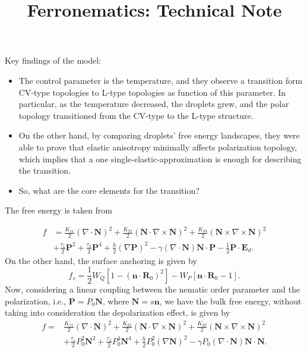 \documentclass[oneside,english]{amsart}
\numberwithin{equation}{section}
\numberwithin{figure}{section}
\begin{document}
\title{Ferronematics: Technical Note}

\maketitle
Key findings of the model:
\begin{itemize}
\item The control parameter is the temperature, and they observe a transition
form CV-type topologies to L-type topologies as function of this parameter.
In particular, as the temperature decreased, the droplets grew, and
the polar topology transitioned from the CV-type to the L-type structure.
\item On the other hand, by comparing droplets\textquoteright{} free energy
landscapes, they were able to prove that elastic anisotropy minimally
affects polarization topology, which implies that a one single-elastic-approximation
is enough for describing the transition.
\item So, what are the core elements for the transition?
\end{itemize}
The free energy is taken from \cite{key-1}

\begin{align*}
f & =\frac{K_{11}}{2}\left(\nabla\cdot\mathbf{N}\right)^{2}+\frac{K_{22}}{2}\left(\mathbf{N}\cdot\nabla\times\mathbf{N}\right)^{2}+\frac{K_{33}}{2}\left(\mathbf{N}\times\nabla\times\mathbf{N}\right)^{2}\\
 & +\frac{\tau_{1}}{2}\mathbf{P}^{2}+\frac{\tau_{2}}{2}\mathbf{P}^{4}+\frac{h}{2}\left(\nabla\mathbf{P}\right)^{2}-\gamma\left(\nabla\cdot\mathbf{N}\right)\mathbf{N}\cdot\mathbf{P}-\frac{1}{2}\mathbf{P}\cdot\mathbf{E}_{d}.
\end{align*}
On the other hand, the surface anchoring is given by 
\[
f_{s}=\frac{1}{2}W_{Q}\left[1-\left(\mathbf{n}\cdot\mathbf{R}_{0}\right)^{2}\right]-W_{P}\left[\mathbf{n}\cdot\mathbf{R}_{0}-1\right].
\]
Now, considering a linear coupling between the nematic order parameter
and the polarization, i.e., $\mathbf{P}=P_{0}\mathbf{N}$, where $\mathbf{N}=s\mathbf{n}$,
we have the bulk free energy, without taking into consideration the
depolarization effect, is given by 
\begin{align*}
f= & \frac{K_{11}}{2}\left(\nabla\cdot\mathbf{N}\right)^{2}+\frac{K_{22}}{2}\left(\mathbf{N}\cdot\nabla\times\mathbf{N}\right)^{2}+\frac{K_{33}}{2}\left(\mathbf{N}\times\nabla\times\mathbf{N}\right)^{2}\\
 & +\frac{\tau_{1}}{2}P_{0}^{2}\mathbf{N}^{2}+\frac{\tau_{2}}{2}P_{0}^{4}\mathbf{N}^{4}+\frac{h}{2}P_{0}^{2}\left(\nabla\mathbf{N}\right)^{2}-\gamma P_{0}\left(\nabla\cdot\mathbf{N}\right)\mathbf{N}\cdot\mathbf{N}.
\end{align*}
\end{document}
